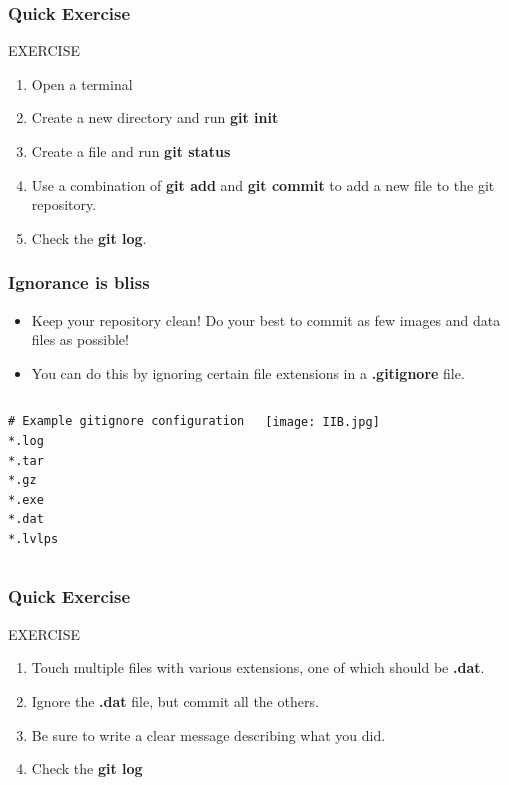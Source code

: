 \documentclass{beamer}
\begin{document}
\begin{frame}[fragile]
\frametitle{Quick Exercise}
    \begin{block}{EXERCISE}
        \begin{enumerate}
        \item Open a terminal
        \item Create a new directory and run \textbf{git init}
        \item Create a file and run \textbf{git status}
        \item Use a combination of \textbf{git add} and \textbf{git commit} to add a new file to the git repository.
        \item Check the \textbf{git log}.
        \end{enumerate}
    \end{block}

\end{frame}

\begin{frame}[fragile]
\frametitle{Ignorance is bliss}

\begin{itemize}
\item Keep your repository clean! Do your best to commit as few images and data files as possible!
\item You can do this by ignoring certain file extensions in a \textbf{.gitignore} file.
\end{itemize}
\begin{columns}
\begin{lstlisting}
# Example gitignore configuration
*.log
*.tar
*.gz
*.exe
*.dat
*.lvlps
\end{lstlisting}
\texttt{[image: IIB.jpg]}
\end{columns}
\end{frame}

\begin{frame}[fragile]
\frametitle{Quick Exercise}
    \begin{block}{EXERCISE}
        \begin{enumerate}
        \item Touch multiple files with various extensions, one of which should be \textbf{.dat}.
        \item Ignore the \textbf{.dat} file, but commit all the others.
        \item Be sure to write a clear message describing what you did.
        \item Check the \textbf{git log}
        \end{enumerate}
    \end{block}

\end{frame}
\end{document}
